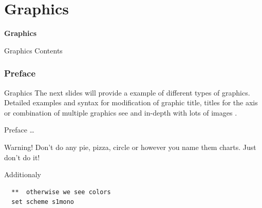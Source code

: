 

\part{Graphics}
\begin{frame}
\thispagestyle{empty}
\textbf{\huge{Graphics}}
\end{frame}

\begin{frame}{Graphics Contents}
 \tableofcontents
\end{frame}


\section{Preface}
\begin{frame}{Graphics}
 The next slides will provide a example of different types of graphics. Detailed examples and syntax for modification of graphic title, titles for the axis or combination of multiple graphics see \textcite[Chap. 6]{Kohler2012} and in-depth with lots of images \textcite{Mitchell2012}.
\end{frame}

\begin{frame}[fragile]{Preface \dots}
\begin{alertblock}{Warning!}
Don't do any pie, pizza, circle or however you name them charts. Just don't do it!
\end{alertblock}
\end{frame}

\begin{frame}[fragile]{Additionaly}  
  \begin{lstlisting}
  **  otherwise we see colors
  set scheme s1mono
 \end{lstlisting}
\end{frame}

